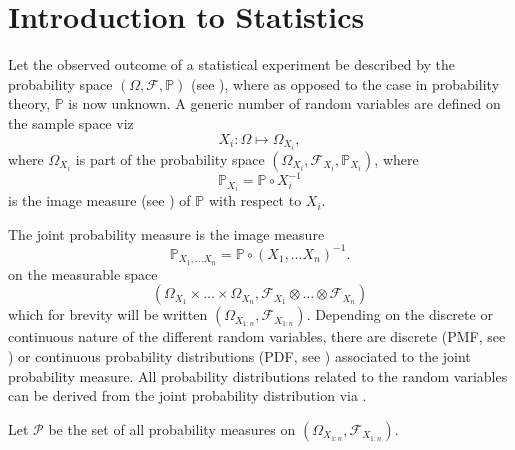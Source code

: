 \chapter{Introduction to Statistics}
\label{chp:statistics_introduction}
Let the observed outcome of a statistical experiment be described by the probability space $(\Omega, \mathcal{F}, \mathbb{P})$ (see ), where as opposed to the case in probability theory, $\mathbb{P}$ is now unknown. A generic number of random variables are defined on the sample space viz~\cite{orbanz2009functional,tausk2023basic, drewitz2019introduction,chan2021introduction}
\begin{equation}
	X_i: \Omega \mapsto \Omega_{X_i},
\end{equation} 
where $\Omega_{X_i}$ is part of the probability space $(\Omega_{X_i},\mathcal{F}_{X_i},\mathbb{P}_{X_i})$, where
\begin{equation}
	\mathbb{P}_{X_i} = \mathbb{P}\circ X_i^{-1}
\end{equation}
is the image measure (see ) of $\mathbb{P}$ with respect to $X_i$. 
\begin{definition}
	The joint probability measure is the image measure
	\begin{equation}
		\mathbb{P}_{X_1,\dots X_n} = \mathbb{P}\circ(X_1,\dots X_n)^{-1}.
	\end{equation}
	on the measurable space 
	\begin{equation}
		(\Omega_{X_1}\times \dots\times \Omega_{X_n}, \mathcal{F}_{X_1}\otimes \dots \otimes \mathcal{F}_{X_n})
	\end{equation}
	which for brevity will be written $(\Omega_{X_{1:n}},\mathcal{F}_{X_{1:n}})$. Depending on the discrete or continuous nature of the different random variables, there are discrete (PMF, see ) or continuous probability distributions (PDF, see ) associated to the joint probability measure. All probability distributions related to the random variables can be derived from the joint probability distribution via .
\end{definition}

\begin{definition}
	Let $\mathcal{P}$ be the set of all probability measures on $(\Omega_{X_{1:n}},\mathcal{F}_{X_{1:n}})$.
\end{definition}


